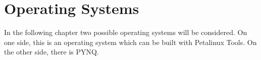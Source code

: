 \section{Operating Systems}
\label{sec:embedded_platform:operating_systems}
In the following chapter two possible operating systems will be considered.
On one side, this is an operating system which can be built with Petalinux Tools.
On the other side, there is PYNQ.





